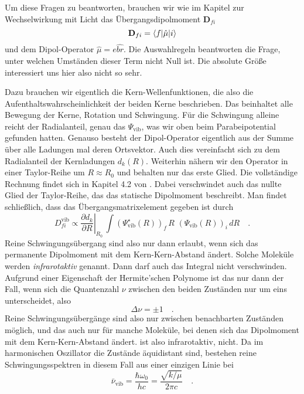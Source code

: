 Um diese Fragen zu beantworten, brauchen wir wie im Kapitel zur Wechselwirkung mit Licht das  Übergangsdipolmoment $\mathbf{D}_{fi}$ 
\begin{equation}
 \mathbf{D}_{fi} = \braket{f | \hat{\mu} | i} 
\end{equation}
und dem Dipol-Operator $\hat{\mu}= e \hat{br}$. Die Auswahlregeln beantworten die Frage, unter welchen Umständen dieser Term nicht Null ist. Die absolute Größe interessiert uns hier also nicht so sehr.


Dazu brauchen wir eigentlich  die Kern-Wellenfunktionen, die also die Aufenthaltswahrscheinlichkeit der beiden Kerne beschrieben. Das beinhaltet alle Bewegung der Kerne, Rotation und Schwingung. Für die Schwingung alleine reicht der Radialanteil, genau das $\Psi_\text{vib}$, was wir oben beim Parabeipotential gefunden hatten.
 Genauso besteht der Dipol-Operator eigentlich aus der Summe über alle Ladungen mal deren Ortsvektor. Auch dies vereinfacht sich zu dem Radialanteil der Kernladungen $d_k(R)$. Weiterhin nähern wir den Operator in einer Taylor-Reihe um $R \approx R_0$ und behalten nur das erste Glied. Die vollständige Rechnung findet sich in Kapitel 4.2 von \cite{Demtröder_molekuelphysik}. Dabei verschwindet auch das nullte Glied der Taylor-Reihe, das das statische Dipolmoment beschreibt. Man findet schließlich, dass das Übergangsmatrixelement gegeben ist durch
\begin{equation}
D_{fi}^\text{vib} \propto  \left. \frac{\partial d_k}{\partial R} \right|_{R_0} \,  \int (\Psi_\text{vib}^\star (R) )_f \, R  \, \, (\Psi_\text{vib} (R) )_i \, dR \quad .
\end{equation}
Reine Schwingungsübergang sind also nur dann erlaubt, wenn sich das permanente Dipolmoment mit dem Kern-Kern-Abstand ändert. Solche Moleküle werden \emph{infrarotaktiv} genannt. Dann  darf auch das Integral nicht verschwinden. Aufgrund einer Eigenschaft der Hermite'schen Polynome ist das nur dann der Fall, wenn sich die Quantenzahl $\nu$ zwischen den beiden Zuständen nur um eins unterscheidet, also 
\begin{equation}
 \Delta \nu = \pm 1 \quad .
\end{equation}
Reine Schwingungsübergänge sind also nur zwischen benachbarten Zuständen möglich, und das auch nur für manche Moleküle, bei denen sich das Dipolmoment mit dem Kern-Kern-Abstand ändert.  ist also infrarotaktiv,  nicht. Da im harmonischen Oszillator die Zustände äquidistant sind, bestehen reine Schwingungsspektren in diesem Fall aus einer einzigen Linie bei 
\begin{equation}
 \bar{\nu}_\text{vib} = \frac{\hbar \omega_0}{h c} = \frac{\sqrt{k / \mu} }{2 \pi  c} \quad .
\end{equation}

